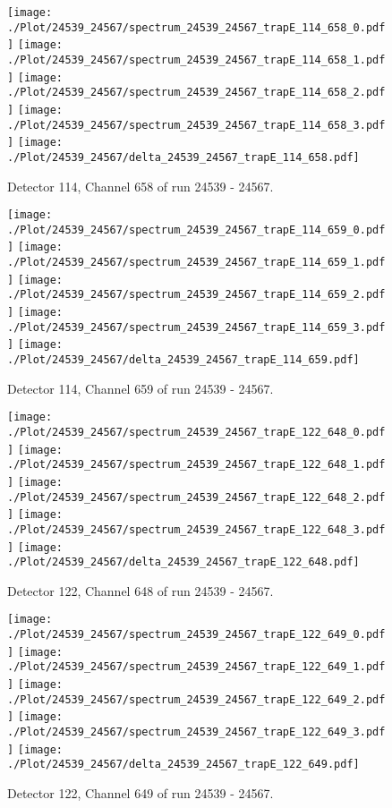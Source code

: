 \clearpage
\begin{figure}[hb]
\centering
\texttt{[image: ./Plot/24539\_24567/spectrum\_24539\_24567\_trapE\_114\_658\_0.pdf]}
\texttt{[image: ./Plot/24539\_24567/spectrum\_24539\_24567\_trapE\_114\_658\_1.pdf]}
\texttt{[image: ./Plot/24539\_24567/spectrum\_24539\_24567\_trapE\_114\_658\_2.pdf]}
\texttt{[image: ./Plot/24539\_24567/spectrum\_24539\_24567\_trapE\_114\_658\_3.pdf]}
\texttt{[image: ./Plot/24539\_24567/delta\_24539\_24567\_trapE\_114\_658.pdf]}
\caption{ Detector 114, Channel 658 of run 24539 - 24567.}
\label{fig:24539_24567_trapE_114_658}
\end{figure}
\clearpage
\begin{figure}[hb]
\centering
\texttt{[image: ./Plot/24539\_24567/spectrum\_24539\_24567\_trapE\_114\_659\_0.pdf]}
\texttt{[image: ./Plot/24539\_24567/spectrum\_24539\_24567\_trapE\_114\_659\_1.pdf]}
\texttt{[image: ./Plot/24539\_24567/spectrum\_24539\_24567\_trapE\_114\_659\_2.pdf]}
\texttt{[image: ./Plot/24539\_24567/spectrum\_24539\_24567\_trapE\_114\_659\_3.pdf]}
\texttt{[image: ./Plot/24539\_24567/delta\_24539\_24567\_trapE\_114\_659.pdf]}
\caption{ Detector 114, Channel 659 of run 24539 - 24567.}
\label{fig:24539_24567_trapE_114_659}
\end{figure}
\clearpage
\begin{figure}[hb]
\centering
\texttt{[image: ./Plot/24539\_24567/spectrum\_24539\_24567\_trapE\_122\_648\_0.pdf]}
\texttt{[image: ./Plot/24539\_24567/spectrum\_24539\_24567\_trapE\_122\_648\_1.pdf]}
\texttt{[image: ./Plot/24539\_24567/spectrum\_24539\_24567\_trapE\_122\_648\_2.pdf]}
\texttt{[image: ./Plot/24539\_24567/spectrum\_24539\_24567\_trapE\_122\_648\_3.pdf]}
\texttt{[image: ./Plot/24539\_24567/delta\_24539\_24567\_trapE\_122\_648.pdf]}
\caption{ Detector 122, Channel 648 of run 24539 - 24567.}
\label{fig:24539_24567_trapE_122_648}
\end{figure}
\clearpage
\begin{figure}[hb]
\centering
\texttt{[image: ./Plot/24539\_24567/spectrum\_24539\_24567\_trapE\_122\_649\_0.pdf]}
\texttt{[image: ./Plot/24539\_24567/spectrum\_24539\_24567\_trapE\_122\_649\_1.pdf]}
\texttt{[image: ./Plot/24539\_24567/spectrum\_24539\_24567\_trapE\_122\_649\_2.pdf]}
\texttt{[image: ./Plot/24539\_24567/spectrum\_24539\_24567\_trapE\_122\_649\_3.pdf]}
\texttt{[image: ./Plot/24539\_24567/delta\_24539\_24567\_trapE\_122\_649.pdf]}
\caption{ Detector 122, Channel 649 of run 24539 - 24567.}
\label{fig:24539_24567_trapE_122_649}
\end{figure}
